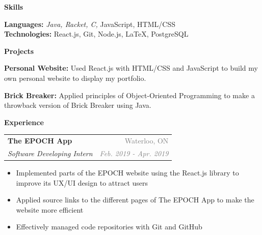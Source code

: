 \documentclass[letterpaper,11pt]{article}
\makeatletter
\newcommand{\resheading}[1]{{\large \colorbox{LightMidnightBlue}{\begin{minipage}{\textwidth}{\textbf{\textrm{#1 \vphantom{p\^{E}}}}}\end{minipage}}}}
\newcommand{\ressubheading}[4]{
\begin{tabular*}{7in}{l@{\extracolsep{\fill}}r}
		\textbf{#1} & \textcolor{gray}{#2} \\
		\textit{#3} & \textcolor{gray}{\textit{#4}} \\
\end{tabular*}\vspace{-6pt}}
\makeatother
\begin{document}
\sffamily

\hline

\vspace{2.5mm}

\resheading{Skills}

\vspace{2.5mm}

\textbf{Languages:} \textit{Java, Racket, C,} JavaScript, HTML/CSS \\
\vspace{1.75mm}
\textbf{Technologies:} React.js, Git, Node.js, \LaTeX, PostgreSQL

\vspace{2.5mm}

\resheading{Projects}

\vspace{2.5mm}

\textbf{Personal Website:} Used React.js with HTML/CSS and JavaScript to build my own personal website to display my portfolio. \\

\vspace{2mm}

\textbf{Brick Breaker:} Applied principles of Object-Oriented Programming to make a throwback version of Brick Breaker using Java.

\vspace{2.5mm}

\resheading{Experience}

\vspace{2.5mm}

    \ressubheading{The EPOCH App}{Waterloo, ON}{Software Developing Intern}{Feb. 2019 - Apr. 2019}
        \begin{itemize}
            \item Implemented parts of the EPOCH website using the React.js library to improve its UX/UI design to attract users
            \item Applied source links to the different pages of The EPOCH App to make the website more efficient
            \item Effectively managed code repositories with Git and GitHub
        \end{itemize}
\end{document}
